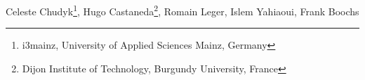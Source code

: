 
Celeste Chudyk\footnote{i3mainz, University of Applied Sciences Mainz, Germany}, Hugo Castaneda\footnote{Dijon Institute of Technology, Burgundy University, France}, Romain Leger, Islem Yahiaoui, Frank Boochs

  
  